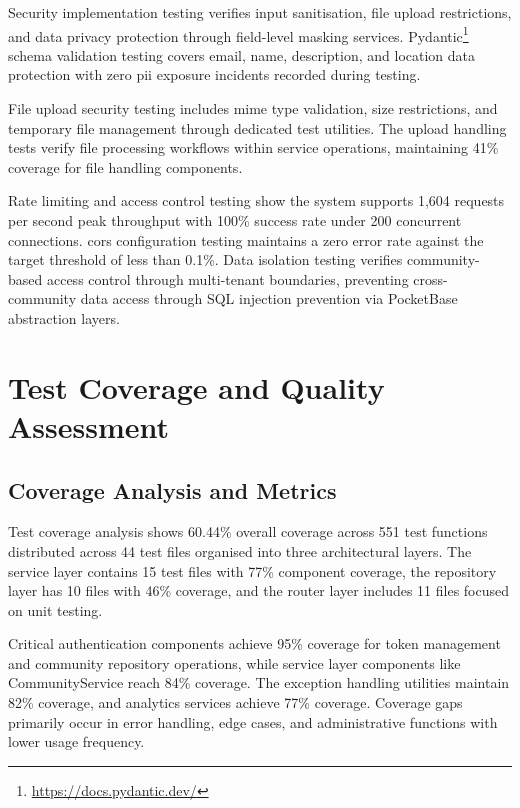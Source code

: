 Security implementation testing verifies input sanitisation, file upload restrictions, and data privacy protection through field-level masking services. Pydantic\footnote{\url{https://docs.pydantic.dev/}} schema validation testing covers email, name, description, and location data protection with zero \ac{pii} exposure incidents recorded during testing.

File upload security testing includes \ac{mime} type validation, size restrictions, and temporary file management through dedicated test utilities. The upload handling tests verify file processing workflows within service operations, maintaining 41\% coverage for file handling components.

Rate limiting and access control testing show the system supports 1,604 requests per second peak throughput with 100\% success rate under 200 concurrent connections. \ac{cors} configuration testing maintains a zero error rate against the target threshold of less than 0.1\%. Data isolation testing verifies community-based access control through multi-tenant boundaries, preventing cross-community data access through SQL injection prevention via PocketBase abstraction layers.


\section{Test Coverage and Quality Assessment} \label{section:test_coverage_quality}

\subsection{Coverage Analysis and Metrics} \label{subsection:coverage_analysis}

Test coverage analysis shows 60.44\% overall coverage across 551 test functions distributed across 44 test files organised into three architectural layers. The service layer contains 15 test files with 77\% component coverage, the repository layer has 10 files with 46\% coverage, and the router layer includes 11 files focused on unit testing.


Critical authentication components achieve 95\% coverage for token management and community repository operations, while service layer components like CommunityService reach 84\% coverage. The exception handling utilities maintain 82\% coverage, and analytics services achieve 77\% coverage. Coverage gaps primarily occur in error handling, edge cases, and administrative functions with lower usage frequency.

